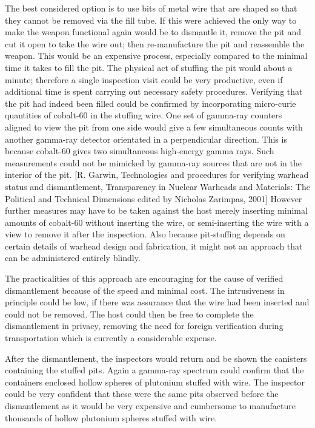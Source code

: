 \documentclass[twocolumn,a4paper]{article}
\begin{document}
The best considered option is to use bits of metal wire that are
shaped so that they cannot be removed via the fill tube.  If this were
achieved the only way to make the weapon functional again would be to
dismantle it, remove the pit and cut it open to take the wire out;
then re-manufacture the pit and reassemble the weapon. This would be an
expensive process, especially compared to the minimal time it takes to
fill the pit.  The physical act of stuffing the pit would about a
minute; therefore a single inspection visit could be very productive,
even if additional time is spent carrying out necessary safety
procedures.  Verifying that the pit had indeed been filled could be
confirmed by incorporating micro-curie quantities of cobalt-60 in the
stuffing wire. One set of gamma-ray counters aligned to view the pit
from one side would give a few simultaneous counts with another
gamma-ray detector orientated in a perpendicular direction.  This is
because cobalt-60 gives two simultaneous high-energy gamma rays. Such
measurements could not be mimicked by gamma-ray sources that are not
in the interior of the pit.  [R. Garwin, Technologies and procedures
  for verifying warhead status and dismantlement, Transparency in
  Nuclear Warheads and Materials: The Political and Technical
  Dimensions edited by Nicholas Zarimpas, 2001] However further
measures may have to be taken against the host merely inserting
minimal amounts of cobalt-60 without inserting the wire, or
semi-inserting the wire with a view to remove it after the
inspection. Also because pit-stuffing depends on certain details of
warhead design and fabrication, it might not an approach that can be
administered entirely blindly.

The practicalities of this approach are encouraging for the cause of
verified dismantlement because of the speed and minimal cost. The
intrusiveness in principle could be low, if there was assurance that
the wire had been inserted and could not be removed. The host could
then be free to complete the dismantlement in privacy, removing the
need for foreign verification during transportation which is currently
a considerable expense.

After the dismantlement, the inspectors would return and be shown the
canisters containing the stuffed pits. Again a gamma-ray spectrum
could confirm that the containers enclosed hollow spheres of plutonium
stuffed with wire. The inspector could be very confident that these
were the same pits observed before the dismantlement as it would be
very expensive and cumbersome to manufacture thousands of hollow
plutonium spheres stuffed with wire.
\end{document}
